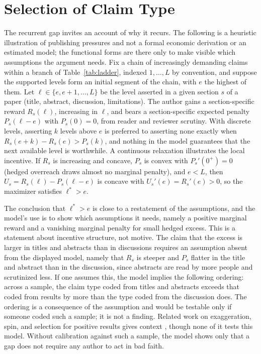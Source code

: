\documentclass[11pt]{article}
\theoremstyle{definition}
\theoremstyle{remark}
\begin{document}
\section{Selection of Claim Type}

The recurrent gap invites an account of why it recurs. The following is a heuristic illustration of publishing pressures and not a formal economic derivation or an estimated model; the functional forms are there only to make visible which assumptions the argument needs. Fix a chain of increasingly demanding claims within a branch of Table~\ref{tab:ladder}, indexed $1,\dots,L$ by convention, and suppose the supported levels form an initial segment of the chain, with $e$ the highest of them. Let $\ell\in\{e,e+1,\dots,L\}$ be the level asserted in a given section $s$ of a paper (title, abstract, discussion, limitations). The author gains a section-specific reward $R_s(\ell)$, increasing in $\ell$, and bears a section-specific expected penalty $P_s(\ell-e)$ with $P_s(0)=0$, from reader and reviewer scrutiny. With discrete levels, asserting $k$ levels above $e$ is preferred to asserting none exactly when $R_s(e+k)-R_s(e)>P_s(k)$, and nothing in the model guarantees that the next available level is worthwhile. A continuous relaxation illustrates the local incentive. If $R_s$ is increasing and concave, $P_s$ is convex with $P_s'(0^+)=0$ (hedged overreach draws almost no marginal penalty), and $e<L$, then $U_s=R_s(\ell)-P_s(\ell-e)$ is concave with $U_s'(e)=R_s'(e)>0$, so the maximizer satisfies $\ell^\ast>e$.

The conclusion that $\ell^\ast>e$ is close to a restatement of the assumptions, and the model's use is to show which assumptions it needs, namely a positive marginal reward and a vanishing marginal penalty for small hedged excess. This is a statement about incentive structure, not motive. The claim that the excess is larger in titles and abstracts than in discussions requires an assumption absent from the displayed model, namely that $R_s$ is steeper and $P_s$ flatter in the title and abstract than in the discussion, since abstracts are read by more people and scrutinized less. If one assumes this, the model implies the following ordering: across a sample, the claim type coded from titles and abstracts exceeds that coded from results by more than the type coded from the discussion does. The ordering is a consequence of the assumption and would be testable only if someone coded such a sample; it is not a finding. Related work on exaggeration, spin, and selection for positive results gives context \cite{smaldino2016,vinkers2015,chiu2017,fraser2018}, though none of it tests this model. Without calibration against such a sample, the model shows only that a gap does not require any author to act in bad faith.
\end{document}
